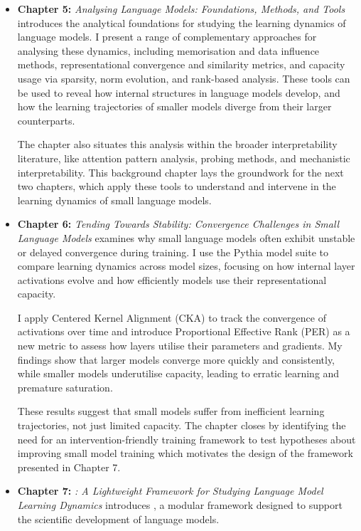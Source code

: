 \begin{itemize}
    \item \textbf{Chapter 5:} \emph{Analysing Language Models: Foundations, Methods, and Tools} introduces the analytical foundations for studying the learning dynamics of language models. I present a range of complementary approaches for analysing these dynamics, including memorisation and data influence methods, representational convergence and similarity metrics, and capacity usage via sparsity, norm evolution, and rank-based analysis. These tools can be used to reveal how internal structures in language models develop, and how the learning trajectories of smaller models diverge from their larger counterparts.

    The chapter also situates this analysis within the broader interpretability literature, like attention pattern analysis, probing methods, and mechanistic interpretability. This background chapter lays the groundwork for the next two chapters, which apply these tools to understand and intervene in the learning dynamics of small language models.

    \item \textbf{Chapter 6:} \emph{Tending Towards Stability: Convergence Challenges in Small Language Models} examines why small language models often exhibit unstable or delayed convergence during training. I use the Pythia model suite to compare learning dynamics across model sizes, focusing on how internal layer activations evolve and how efficiently models use their representational capacity.

    I apply Centered Kernel Alignment (CKA) to track the convergence of activations over time and introduce Proportional Effective Rank (PER) as a new metric to assess how layers utilise their parameters and gradients. My findings show that larger models converge more quickly and consistently, while smaller models underutilise capacity, leading to erratic learning and premature saturation.
    
    These results suggest that small models suffer from inefficient learning trajectories, not just limited capacity. The chapter closes by identifying the need for an intervention-friendly training framework to test hypotheses about improving small model training which motivates the design of the \pico framework presented in Chapter 7.

    \item \textbf{Chapter 7:} \emph{\pico: A Lightweight Framework for Studying Language Model Learning Dynamics} introduces \pico, a modular framework designed to support the scientific development of language models.


\end{itemize}
